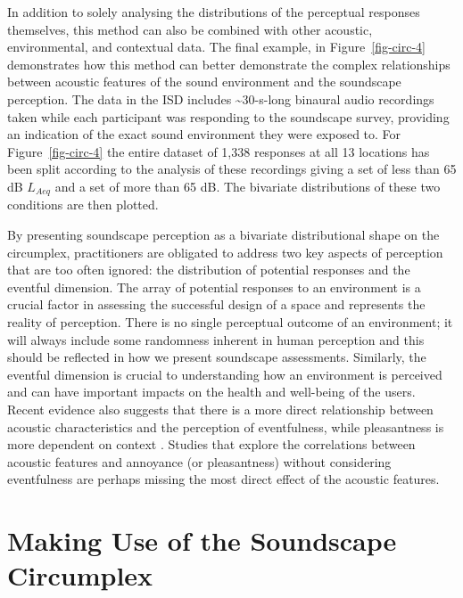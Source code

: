 \documentclass[
  authoryear,
  preprint,
  3p]{elsarticle}
\begin{document}
In addition to solely analysing the distributions of the perceptual
responses themselves, this method can also be combined with other
acoustic, environmental, and contextual data. The final example, in
Figure~\ref{fig-circ-4} demonstrates how this method can better
demonstrate the complex relationships between acoustic features of the
sound environment and the soundscape perception. The data in the ISD
includes \textasciitilde30-s-long binaural audio recordings taken while
each participant was responding to the soundscape survey, providing an
indication of the exact sound environment they were exposed to. For
Figure~\ref{fig-circ-4} the entire dataset of 1,338 responses at all 13
locations has been split according to the analysis of these recordings
giving a set of less than 65 dB \(L_{Aeq}\) and a set of more than 65
dB. The bivariate distributions of these two conditions are then
plotted.

By presenting soundscape perception as a bivariate distributional shape
on the circumplex, practitioners are obligated to address two key
aspects of perception that are too often ignored: the distribution of
potential responses and the eventful dimension. The array of potential
responses to an environment is a crucial factor in assessing the
successful design of a space and represents the reality of perception.
There is no single perceptual outcome of an environment; it will always
include some randomness inherent in human perception and this should be
reflected in how we present soundscape assessments. Similarly, the
eventful dimension is crucial to understanding how an environment is
perceived and can have important impacts on the health and well-being of
the users. Recent evidence also suggests that there is a more direct
relationship between acoustic characteristics and the perception of
eventfulness, while pleasantness is more dependent on context
\citep{Mitchell2021Investigating}. Studies that explore the correlations
between acoustic features and annoyance (or pleasantness) without
considering eventfulness are perhaps missing the most direct effect of
the acoustic features.

\hypertarget{making-use-of-the-soundscape-circumplex}{%
\section{Making Use of the Soundscape
Circumplex}\label{making-use-of-the-soundscape-circumplex}}
\end{document}
